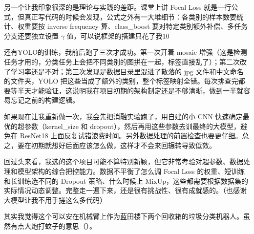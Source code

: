\documentclass[11pt,a4paper]{ctexart}
\begin{document}
另一个让我印象很深的是理论与实践的差距。课堂上讲 Focal Loss 就是一行公式，但真正写代码的时候会发现，公式之外有一大堆细节：各类别的样本数要统计、权重要按 inverse frequency 算、class\_boost 要对特定类别额外补偿、多任务分支还要独立设置 $\gamma$ 值，可以说框架的搭建只花了我10%

还有YOLO的训练，我前后跑了三次才成功。第一次开着 mosaic 增强（这是检测任务才用的，分类任务上会把不同类别的图拼在一起，标签直接乱了）；第二次改了学习率还是不对；第三次发现是数据目录里混进了散落的 jpg 文件和中文命名的文件夹，YOLO 把这些当成了额外的类别，整个标签映射全错。每次排查完都要等半天才能验证，这说明我在项目初期的架构制定还是不够清晰，做到一半就容易忘记之前的构建逻辑。

如果现在让我重新做一次，我会先把消融实验跑了，用自建的小 CNN 快速确定最优的超参数（kernel\_size 和 dropout），然后再用这些参数去训最终的大模型，避免在 ResNet18 上面反复试错浪费时间。另外数据处理的前置检查也要更仔细。总之，要在初期就想好后面应该怎么做，这样才不会来回辗转导致低效。

回过头来看，我选的这个项目可能不算特别新颖，但它非常考验对超参数、数据处理和模型架构的综合把控能力。数据不平衡了怎么调 Focal Loss 的权重、短训练和长训练选不同的 Dropout 策略、什么时候上 MixUp，这些都需要根据数据集的实际情况动态调整。完整走一遍下来，还是很有挑战性、很有成就感的。（也感谢大模型让我不用手搓这么多代码）

其实我觉得这个可以安在机械臂上作为蓝田楼下两个回收箱的垃圾分类机器人。虽然有点大炮打蚊子的意思（）。
\vspace{12pt}
\hfill\songti
\end{document}
